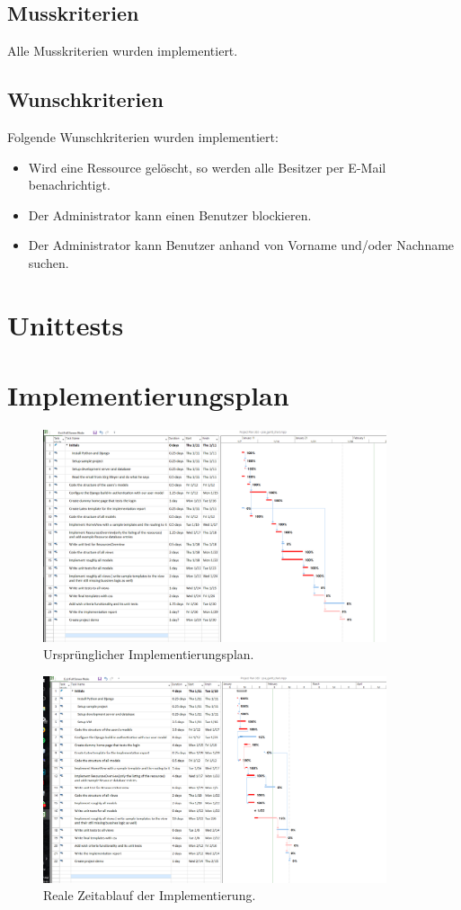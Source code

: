 \documentclass[parskip=full,11pt]{scrartcl}
\begin{document}
\subsection{Musskriterien}
Alle Musskriterien wurden implementiert.

\subsection{Wunschkriterien}
Folgende Wunschkriterien wurden implementiert:
\begin{itemize}
\item Wird eine Ressource gelöscht, so werden alle Besitzer per E-Mail benachrichtigt.
\item Der Administrator kann einen Benutzer blockieren.
\item Der Administrator kann Benutzer anhand von Vorname und/oder Nachname suchen.
\end{itemize}


\newpage
\section{Unittests}


\newpage
\section{Implementierungsplan}
 \begin{figure}[ht!]
 	\centering
 	\includegraphics[width=0.9\textwidth]{res/gannt_plan.png}
 	\caption{Ursprünglicher Implementierungsplan.}
 \end{figure}
  \begin{figure}[ht!]
 	\centering
 	\includegraphics[width=0.9\textwidth]{res/gannt_real.png}
 	\caption{Reale Zeitablauf der Implementierung.}
 \end{figure}
\end{document}
